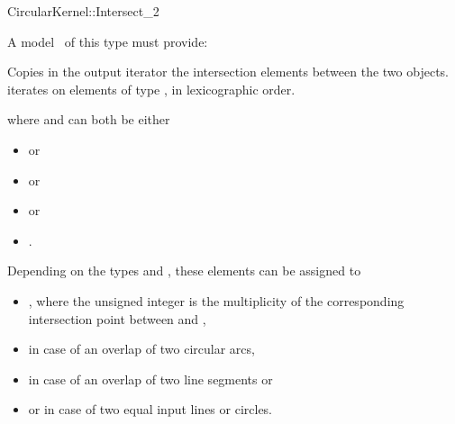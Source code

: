 \begin{ccRefFunctionObjectConcept}{CircularKernel::Intersect_2}

\ccRefines



A model \ccVar\ of this type must provide:

{Copies in the output iterator the intersection elements between the
two objects.  iterates on
elements of type , in lexicographic order.}

where  and  can both be either
\begin{itemize}
\item {}  or
\item {}  or
\item {}  or
\item {} .
\end{itemize} 

Depending on the types  and , these elements can be
assigned to 
\begin{itemize}
\item {} ,
where the unsigned integer is the multiplicity of the corresponding
intersection point between  and ,
\item {}  in case of an overlap of 
two circular arcs,
\item {}  in case of an overlap of two 
line segments or
\item {}  or  
in case of two equal input lines or circles. 
\end{itemize} 

\ccSeeAlso




\end{ccRefFunctionObjectConcept}

